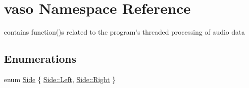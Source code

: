 \hypertarget{namespacevaso}{\section{vaso Namespace Reference}
\label{namespacevaso}
}


contains function()s related to the program's threaded processing of audio data  


\subsection*{Enumerations}
\begin{DoxyCompactItemize}
\item 
enum \hyperlink{namespacevaso_a77c5d9704657d49d456f691ddd8abf7c}{Side} \{ \hyperlink{namespacevaso_a77c5d9704657d49d456f691ddd8abf7ca945d5e233cf7d6240f6b783b36a374ff}{Side\+::\+Left}, 
\hyperlink{namespacevaso_a77c5d9704657d49d456f691ddd8abf7ca92b09c7c48c520c3c55e497875da437c}{Side\+::\+Right}
 \}
\end{DoxyCompactItemize}
